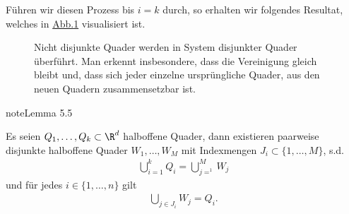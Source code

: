\documentclass[letterpaper,10pt,german]{jupyterBook}
\let\sphinxpxdimen\pdfpxdimen\else\newdimen\sphinxpxdimen
\begin{document}
\sphinxAtStartPar
Führen wir diesen Prozess bis \(i=k\) durch, so erhalten wir folgendes Resultat, welches in \hyperref[\detokenize{masstheorie/masstheorie:fig-disrect}]{Abb.\@ \ref{\detokenize{masstheorie/masstheorie:fig-disrect}}} visualisiert ist.

\begin{figure}[htbp]
\centering
\capstart

\noindent\sphinxincludegraphics[width=400\sphinxpxdimen]{{DisRect}.jpg}
\caption{Nicht disjunkte Quader werden in System disjunkter Quader überführt. Man erkennt insbesondere, dass die Vereinigung gleich bleibt und, dass sich jeder einzelne ursprüngliche Quader, aus den neuen Quadern zusammensetzbar ist.}\label{\detokenize{masstheorie/masstheorie:fig-disrect}}\end{figure}
\label{masstheorie/masstheorie:lem:disRect}
\begin{sphinxadmonition}{note}{Lemma 5.5}



\sphinxAtStartPar
Es seien \(Q_1,\ldots,Q_k\subset\R^d\) halboffene Quader, dann existieren paarweise disjunkte halboffene Quader \(W_1,\ldots, W_M\) mit Indexmengen \(J_i\subset\{1,\ldots,M\}\), s.d.
\begin{equation*}
\begin{split}\bigcup_{i=1}^k Q_i = \bigcup_{j=^1}^M W_j\end{split}
\end{equation*}
\sphinxAtStartPar
und für jedes \(i\in\{1,\ldots,n\}\) gilt
\begin{equation*}
\begin{split}\bigcup_{j\in J_i} W_j = Q_i.\end{split}
\end{equation*}\end{sphinxadmonition}
\end{document}
